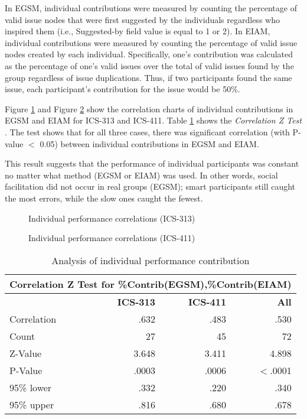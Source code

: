In EGSM, individual contributions were measured by counting the
percentage of valid issue nodes that were first suggested by the
individuals regardless who inspired them 
(i.e., Suggested-by field value is equal to 1 or 2).
In EIAM, individual contributions were measured by counting the
percentage of valid issue nodes created by each individual. 
Specifically, one's contribution was calculated as the percentage of
one's valid issues over the total of valid issues found by the group
regardless of issue duplications. Thus, if two participants found the same
issue, each participant's contribution for the issue would be 50\%.

Figure \ref{correlation-313} and Figure \ref{correlation-411} show
the correlation charts of individual contributions in EGSM and EIAM for
ICS-313 and ICS-411. 
Table \ref{correlation-analysis} shows the {\it
Correlation Z Test} \cite{StatView92}. The
test shows that for all three cases, there was significant
correlation (with P-value $<$ 0.05) between individual contributions
in EGSM and EIAM.

This result suggests that the performance of
individual participants was constant no matter what method (EGSM or
EIAM) was used. In other words, social facilitation did not occur in
real groups (EGSM); smart participants still caught the most
errors, while the slow ones caught the fewest.


\begin{figure}[htb]
 {\centerline{}}
 \caption{Individual performance correlations (ICS-313)}
 \label{correlation-313}
\end{figure}


\begin{figure}[htb]
 {\centerline{}}
 \caption{Individual performance correlations (ICS-411)}
 \label{correlation-411}
\end{figure}

\begin{table}[htb]
 \caption{Analysis of individual performance contribution}
 \begin{center}
 \begin{tabular}{|l|r|r|r|}
  \hline
  \multicolumn{4}{|c|}{\bf Correlation Z Test for \%Contrib(EGSM),\%Contrib(EIAM)}\\
  \hline
             & {\bf ICS-313} & {\bf ICS-411} & {\bf All} \\ 
  \hline
   Correlation   & .632   & .483 & .530\\
   Count         & 27     & 45   &  72\\
   Z-Value       & 3.648  & 3.411 & 4.898\\
   P-Value       & .0003  & .0006 & $<$.0001\\
   95\% lower     & .332 & .220  & .340\\ 
   95\% upper     & .816 & .680 & .678\\
  \hline
   \end{tabular}
  \end{center}
  \label{correlation-analysis}
\end{table} 


